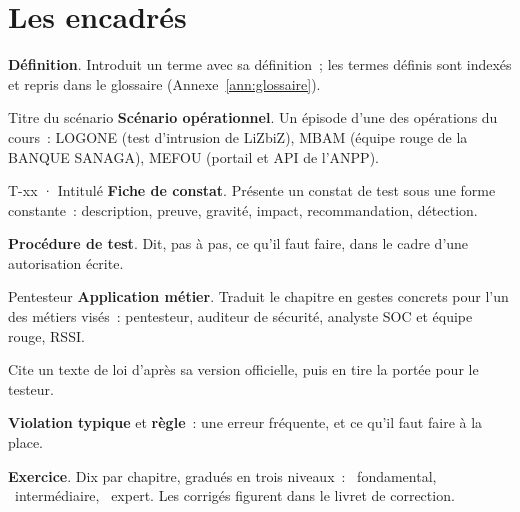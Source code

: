 \section*{Les encadrés}

\begin{boxdef}
\textbf{Définition}. Introduit un terme avec sa définition~; les termes
définis sont indexés et repris dans le glossaire (Annexe~\ref{ann:glossaire}).
\end{boxdef}

\begin{boxscenario}{Titre du scénario}
\textbf{Scénario opérationnel}. Un épisode d'une des opérations du
cours~: LOGONE (test d'intrusion de LiZbiZ), MBAM (équipe rouge de la BANQUE
SANAGA), MEFOU (portail et API de l'ANPP).
\end{boxscenario}

\begin{boxobjet}{T-xx · Intitulé}
\textbf{Fiche de constat}. Présente un constat de test sous une forme
constante~: description, preuve, gravité, impact, recommandation,
détection.
\end{boxobjet}

\begin{boxprocedure}
\textbf{Procédure de test}. Dit, pas à pas, ce qu'il faut faire, dans le
cadre d'une autorisation écrite.
\end{boxprocedure}

\begin{boxmetier}{Pentesteur}
\textbf{Application métier}. Traduit le chapitre en gestes concrets pour
l'un des métiers visés~: pentesteur, auditeur de sécurité, analyste SOC et
équipe rouge, RSSI.
\end{boxmetier}

\begin{boxjuris}
Cite un texte de loi d'après sa version officielle, puis en tire la
portée pour le testeur.
\end{boxjuris}

\begin{boxalert}
\textbf{Violation typique} et \textbf{règle}~: une erreur fréquente, et ce
qu'il faut faire à la place.
\end{boxalert}

\begin{boxexo}
\textbf{Exercice}. Dix par chapitre, gradués en trois niveaux~:
\niveaubase\ fondamental, \niveaumoyen\ intermédiaire, \niveauexpert\
expert. Les corrigés figurent dans le livret de correction.
\end{boxexo}

